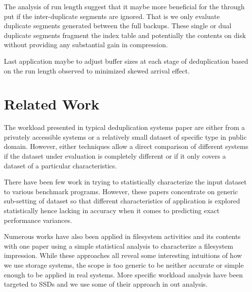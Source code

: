 The analysis of run length suggest that it maybe more beneficial for the through put if the inter-duplicate segments are ignored. That is we only evaluate duplicate segments generated between the full backups. These single or dual duplicate segments fragment the index table and potentially the contents on disk without providing any substantial gain in compression. 

Last application maybe to adjust buffer sizes at each stage of deduplication based on the run length observed to minimized skewed arrival effect. 

\section{Related Work}\label{rel}
The workload presented in typical deduplication systems paper are either from a privately accessible systems\cite{clements2009decentralized, Rhea:2008:FIC:1404014.1404025, manber1994finding,citeulike:6856151, Aronovich:2009:DSB:1534530.1534539, Lillibridge:2009:SIL:1525908.1525917, Zhu:2008:ADB:1364813.1364831} or a relatively small dataset of specific type in public domain\cite{Storer:2008:SDD:1456469.1456471,kruus-bimodal,eshghi2005framework}. However, either techniques allow a direct comparison of different systems if the dataset under evaluation is completely different or if it only covers a dataset of a particular characteristics. 

There have been few work in trying to statistically characterize the input dataset to various benchmark programs\cite{Eeckhout03quantifyingthe, Yi02astatistically,Hsu:2002:PPB:857192.857758}. However, these papers concentrate on generic sub-setting of dataset so that different characteristics of application is explored statistically hence lacking in accuracy when it comes to predicting exact performance variances. 

Numerous works have also been applied in filesystem activities and its contents\cite{douceur1999large, Leung:2008:MAL:1404014.1404030, Douceur:1999:LSF:301464.301480} with one paper using a simple statistical analysis to characterize a filesystem impression\cite{ Agrawal:2009:GRI:1629080.1629086}. While these approaches all reveal some interesting intuitions of how we use storage systems, the scope is too generic to be neither accurate or simple enough to be applied in real systems. More specific workload analysis have been targeted to SSDs\cite{ soundararajan2010extending} and we use some of their approach in out analysis. 


